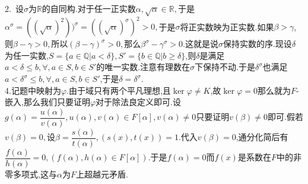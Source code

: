 \documentclass[b5paper]{ctexart}
\begin{document}
2.~设$\sigma$为$\mathbb{R}$的自同构.对于任一正实数$\alpha,\sqrt{\alpha}\in\mathbb{R},$于是$\alpha^{\sigma}=((\sqrt{\alpha})^2))^\sigma=((\sqrt{\alpha})^\sigma)^2>0,$于是$\sigma$将正实数映为正实数.如果$\beta>\gamma$,则$\beta-\gamma>0,$所以$(\beta-\gamma)^\sigma>0,$那么$\beta^\sigma-\gamma^\sigma>0.$这就是说$\sigma$保持实数的序.现设$\delta$为任一实数,$S=\{a\in\mathbb{Q}|a<\delta\},S'=\{b\in\mathbb{Q}|b\geq\delta\}$,则$\delta$是满足$a<\delta\leq b,\forall,a\in S,b\in S'$的唯一实数.注意有理数在$\sigma$下保持不动.于是$\delta^\sigma$也满足$a<\delta^\sigma\leq b,\forall,a\in S,b\in S'$,于是$\delta=\delta^\sigma$.\\
4.记题中映射为$\varphi$.由于域只有两个平凡理想,且$\ker \varphi\neq K$,故$\ker \varphi=0$那么就为$F$-嵌入,那么我们只要证明$\varphi$对于除法良定义即可.设$g(\alpha)=\dfrac{u(\alpha)}{v(\alpha)},u(\alpha),v(\alpha)\in F[\alpha],v(\alpha)\neq 0$只要证明$v(\beta)\neq 0$即可.假若$v(\beta)=0,$设$\beta=\dfrac{s(\alpha)}{t(\alpha)},(s(x),t(x))=1.$代入$v(\beta)=0$,通分化简后有$\dfrac{f(\alpha)}{h(\alpha)}=0,(f(\alpha),h(\alpha)\in F[\alpha]).$于是$f(\alpha)=0$而$f(x)$是系数在$F$中的非零多项式,这与$\alpha$为$F$上超越元矛盾.
\end{document}
